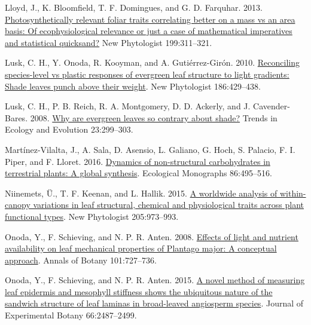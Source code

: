 \documentclass[
  12pt,
]{article}
\newlength{\cslhangindent} %
\newlength{\cslentryspacingunit} %
\newenvironment{CSLReferences}[2] %
 {%
  \setlength{\parindent}{0pt} %
  \ifodd #1 %
  \let\oldpar\par %
  \def\par{\hangindent=\cslhangindent\oldpar} %
  \fi %
  \setlength{\parskip}{#2\cslentryspacingunit} %
 }%
 {} %
\begin{document}
\begin{CSLReferences}{1}{0}
\leavevmode{}%
Lloyd, J., K. Bloomfield, T. F. Domingues, and G. D. Farquhar. 2013. \href{https://doi.org/10.1111/nph.12281}{Photosynthetically relevant foliar traits correlating better on a mass vs an area basis: {Of} ecophysiological relevance or just a case of mathematical imperatives and statistical quicksand?} New Phytologist 199:311--321.

\leavevmode{}%
Lusk, C. H., Y. Onoda, R. Kooyman, and A. Gutiérrez-Girón. 2010. \href{https://doi.org/10.1111/j.1469-8137.2010.03202.x}{Reconciling species-level vs plastic responses of evergreen leaf structure to light gradients: {Shade} leaves punch above their weight}. New Phytologist 186:429--438.

\leavevmode{}%
Lusk, C. H., P. B. Reich, R. A. Montgomery, D. D. Ackerly, and J. Cavender-Bares. 2008. \href{https://doi.org/10.1016/j.tree.2008.02.006}{Why are evergreen leaves so contrary about shade?} Trends in Ecology and Evolution 23:299--303.

\leavevmode{}%
Martínez-Vilalta, J., A. Sala, D. Asensio, L. Galiano, G. Hoch, S. Palacio, F. I. Piper, and F. Lloret. 2016. \href{https://doi.org/10.1002/ecm.1231}{Dynamics of non-structural carbohydrates in terrestrial plants: A global synthesis}. Ecological Monographs 86:495--516.

\leavevmode{}%
Niinemets, Ü., T. F. Keenan, and L. Hallik. 2015. \href{https://doi.org/10.1111/nph.13096}{A worldwide analysis of within-canopy variations in leaf structural, chemical and physiological traits across plant functional types}. New Phytologist 205:973--993.

\leavevmode{}%
Onoda, Y., F. Schieving, and N. P. R. Anten. 2008. \href{https://doi.org/10.1093/aob/mcn013}{Effects of light and nutrient availability on leaf mechanical properties of {Plantago} major: {A} conceptual approach}. Annals of Botany 101:727--736.

\leavevmode{}%
Onoda, Y., F. Schieving, and N. P. R. Anten. 2015. \href{https://doi.org/10.1093/jxb/erv024}{A novel method of measuring leaf epidermis and mesophyll stiffness shows the ubiquitous nature of the sandwich structure of leaf laminas in broad-leaved angiosperm species}. Journal of Experimental Botany 66:2487--2499.


\end{CSLReferences}
\end{document}
